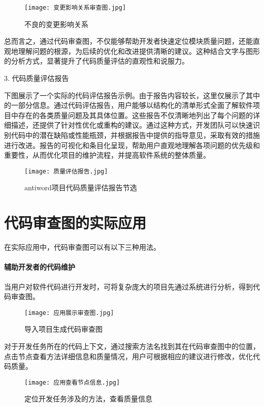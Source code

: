 \begin{figure}[h]
\centering
\texttt{[image: 变更影响关系审查图.jpg]}
\caption{不良的变更影响关系}
\end{figure}


总而言之，通过代码审查图，不仅能够帮助开发者快速定位模块质量问题，还能直观地理解问题的根源，为后续的优化和改进提供清晰的建议。这种结合文字与图形的分析方式，显著提升了代码质量评估的直观性和说服力。

3. 代码质量评估报告

下图展示了一个实际的代码评估报告示例。由于报告内容较长，这里仅展示了其中的一部分信息。通过代码评估报告，用户能够以结构化的清单形式全面了解软件项目中存在的各类质量问题及其具体位置。这些报告不仅清晰地列出了每个问题的详细描述，还提供了针对性优化或重构的建议。通过这种方式，开发团队可以快速识别代码中的潜在缺陷或性能瓶颈，并根据报告中提供的指导意见，采取有效的措施进行改进。报告的可视化和条目化呈现，帮助用户直观地理解各项问题的优先级和重要性，从而优化项目的维护流程，并提高软件系统的整体质量。

\begin{figure}[h]
\centering
\texttt{[image: 质量评估报告.jpg]}
\caption{antiword项目代码质量评估报告节选}
\end{figure}


\section{代码审查图的实际应用}

在实际应用中，代码审查图可以有以下三种用法。

\paragraph{辅助开发者的代码维护} 当用户对软件代码进行开发时，可将复杂庞大的项目先通过系统进行分析，得到代码审查图。

\begin{figure}[h]
\centering
\texttt{[image: 应用展示审查图.jpg]}
\caption{导入项目生成代码审查图}
\end{figure}

对于开发任务所在的代码上下文，通过搜索方法名找到其在代码审查图中的位置，点击节点查看方法详细信息和质量情况，用户可根据相应的建议进行修改，优化代码质量。

\begin{figure}[h]
\centering
\texttt{[image: 应用查看节点信息.jpg]}
\caption{定位开发任务涉及的方法，查看质量信息}
\end{figure}

